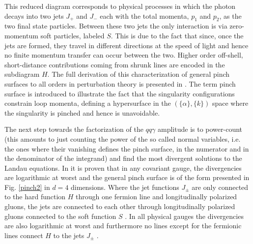\documentclass[%
 reprint,
 amsmath,amssymb,
 aps,
]{revtex4-1}
\begin{document}
This reduced diagram corresponds to physical processes in which the photon decays into two jets $J_+$ and $J_-$ each with the total momenta, $p_1$ and $p_2$, as the two final state particles. Between these two jets the only interaction is via zero-momentum soft particles, labeled $S$. This is due to the fact that since, once the jets are formed, they travel in different directions at the speed of light and hence no finite momentum transfer can occur between the two. Higher order off-shell, short-distance contributions coming from shrunk lines are encoded in the subdiagram $H$. The full derivation of this characterization of general pinch surfaces to all orders in perturbation theory is presented in \cite{Sterman1}. The term pinch surface is introduced to illustrate the fact that the singularity configurations constrain loop momenta, defining a hypersurface in the $(\{\alpha\},\{k\})$ space where the singularity is pinched and hence is unavoidable. \par
The next step towards the factorization of the $qq\gamma$ amplitude is to power-count (this amounts to just counting the power of the so called normal variables, i.e. the ones where their vanishing defines the pinch surface, in the numerator and in the denominator of the integrand) and find the most divergent solutions to the Landau equations. In \cite{Sterman1} it is proven that in any covariant gauge, the divergencies are logarithmic at worst and the general pinch surface is of the form presented in Fig. \ref{pinch2} in $d=4$ dimensions. Where the jet functions $J_\pm$ are only connected to the hard function $H$ through one fermion line and longitudinally polarized gluons, the jets are connected to each other through longitudinally polarized gluons connected to the soft function $S$ \cite{Collins}. In all physical gauges the divergencies are also logarithmic at worst and furthermore no lines except for the fermionic lines connect $H$ to the jets $J_\pm$ \cite{Stermannotes}.
\end{document}
